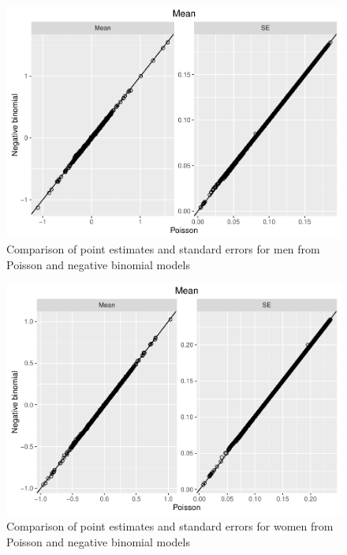 \documentclass[]{article}
\begin{document}
\pagebreak

\begin{figure}[htbp]
\centering
\includegraphics{Thesis_files/figure-latex/male-nbinom-1.pdf}
\caption{Comparison of point estimates and standard errors for men from
Poisson and negative binomial models}
\end{figure}

\begin{figure}[htbp]
\centering
\includegraphics{Thesis_files/figure-latex/female-nbinom-1.pdf}
\caption{Comparison of point estimates and standard errors for women
from Poisson and negative binomial models}
\end{figure}
\end{document}
